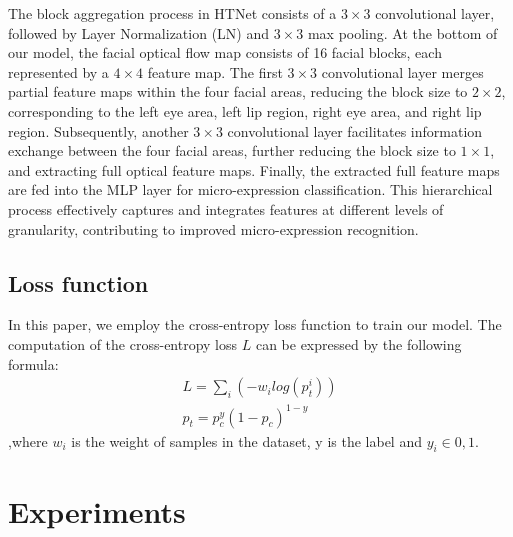 \documentclass[review,12pt, 3p]{elsarticle}
\begin{document}
The block aggregation process in HTNet consists of a $3 \times 3$ convolutional layer, followed by Layer Normalization (LN) and $3 \times 3$ max pooling. At the bottom of our model, the facial optical flow map consists of 16 facial blocks, each represented by a $4 \times 4$ feature map. The first $3 \times 3$ convolutional layer merges partial feature maps within the four facial areas, reducing the block size to $2 \times 2$, corresponding to the left eye area, left lip region, right eye area, and right lip region. Subsequently, another $3 \times 3$ convolutional layer facilitates information exchange between the four facial areas, further reducing the block size to $1 \times 1$, and extracting full optical feature maps. Finally, the extracted full feature maps are fed into the MLP layer for micro-expression classification. This hierarchical process effectively captures and integrates features at different levels of granularity, contributing to improved micro-expression recognition.\\
\subsection{Loss function}
In this paper, we employ the cross-entropy loss function to train our model. The computation of the cross-entropy loss $L$ can be expressed by the following formula:
 \begin{equation}
\begin{aligned}
L = \sum_i(-w_i log(p_t^i))\\
p_t = p_c^y(1-p_c)^{1-y}
\end{aligned}
\label{loss-entropy}
\end{equation}
,where $w_i$ is the weight of samples in the dataset, y is the label and $y_i \in {0,1}$.
\\
\section{Experiments}
\end{document}
